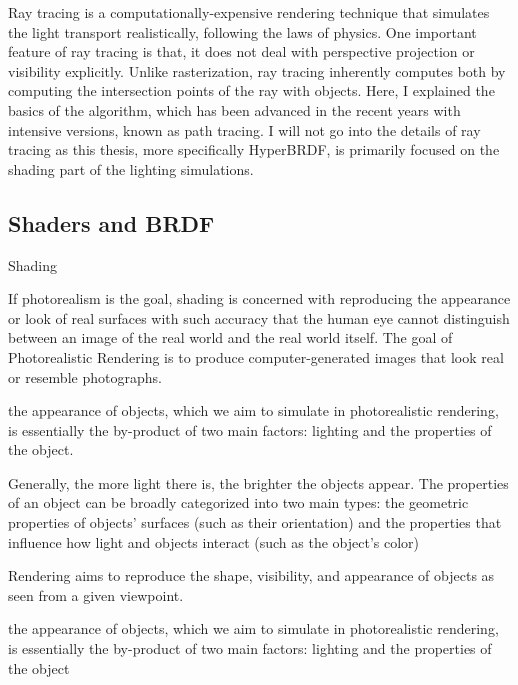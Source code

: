 Ray tracing is a computationally-expensive rendering technique that simulates the light transport realistically, following the laws of physics. One important feature of ray tracing is that, it does not deal with perspective projection or visibility explicitly. Unlike rasterization, ray tracing inherently computes both by computing the intersection points of the ray with objects. Here, I explained the basics of the algorithm, which has been advanced in the recent years with intensive versions, known as path tracing. I will not go into the details of ray tracing as this thesis, more specifically HyperBRDF, is primarily focused on the shading part of the lighting simulations.

\subsection{Shaders and BRDF}

Shading 

If photorealism is the goal, shading is concerned with reproducing the appearance or look of real surfaces with such accuracy that the human eye cannot distinguish between an image of the real world and the real world itself. The goal of Photorealistic Rendering is to produce computer-generated images that look real or resemble photographs. 

the appearance of objects, which we aim to simulate in photorealistic rendering, is essentially the by-product of two main factors: lighting and the properties of the object.

 Generally, the more light there is, the brighter the objects appear. The properties of an object can be broadly categorized into two main types: the geometric properties of objects' surfaces (such as their orientation) and the properties that influence how light and objects interact (such as the object's color)


Rendering aims to reproduce the shape, visibility, and appearance of objects as seen from a given viewpoint. 

the appearance of objects, which we aim to simulate in photorealistic rendering, is essentially the by-product of two main factors: lighting and the properties of the object

